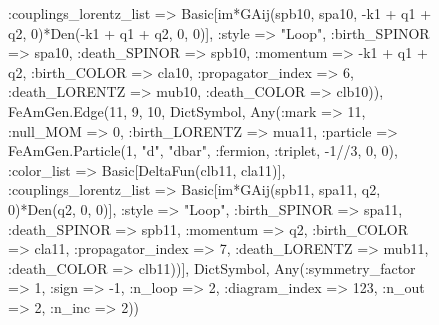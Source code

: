 \documentclass{revtex4}
\begin{document}
\begin{figure}[!htb]
\begin{center}
{:couplings_lorentz_list => Basic[im*GAij(spb10, spa10, -k1 + q1 + q2, 0)*Den(-k1 + q1 + q2, 0, 0)], :style => "Loop", :birth_SPINOR => spa10, :death_SPINOR => spb10, :momentum => -k1 + q1 + q2, :birth_COLOR => cla10, :propagator_index => 6, :death_LORENTZ => mub10, :death_COLOR => clb10)), FeAmGen.Edge(11, 9, 10, Dict{Symbol, Any}(:mark => 11, :null_MOM => 0, :birth_LORENTZ => mua11, :particle => FeAmGen.Particle(1, "d", "dbar", :fermion, :triplet, -1//3, 0, 0), :color_list => Basic[DeltaFun(clb11, cla11)], :couplings_lorentz_list => Basic[im*GAij(spb11, spa11, q2, 0)*Den(q2, 0, 0)], :style => "Loop", :birth_SPINOR => spa11, :death_SPINOR => spb11, :momentum => q2, :birth_COLOR => cla11, :propagator_index => 7, :death_LORENTZ => mub11, :death_COLOR => clb11))], Dict{Symbol, Any}(:symmetry_factor => 1, :sign => -1, :n_loop => 2, :diagram_index => 123, :n_out => 2, :n_inc => 2)) 
}
\end{center}
\end{figure}
\end{document}
